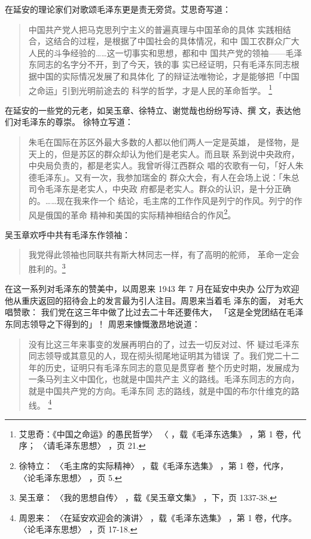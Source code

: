 在延安的理论家们对歌颂毛泽东更是责无旁贷。艾思奇写道：
\begin{quote}
	\fzwkai 中国共产党人把马克思列宁主义的普遍真理与中国革命的具体
实践相结合，这结合的过程，是根据了中国社会的具体情况，和中
国工农群众广大人民的斗争经验的……这一切事实和思想，都和中
国共产党的领袖——毛泽东同志的名字分不开，到了今天，铁的事
实已经证明，只有毛泽东同志根据中国的实际情况发展了和具体化
了的辩证法唯物论，才是能够把「中国之命运」引到光明前途去的
科学的哲学，才是人民的革命哲学。
\footnote{艾思奇：《中国之命运》的愚民哲学〉
〈
，载《毛泽东选集》
，第 1 卷，代序；
〈请毛泽东思想〉
，页 21.}
\end{quote}

在延安的一些党的元老，如吴玉章、徐特立、谢觉哉也纷纷写诗、撰
文，表达他们对毛泽东的尊崇。
徐特立写道：
\begin{quote}
	\fzwkai 朱毛在国际在苏区外最大多数的人都以他们两人一定是英雄，
是怪物，是天上的，但是苏区的群众却认为他们是老实人。而且联
系到说中央政府，中央局负责的，都是老实人。我曾听得江西群众
唱的农歌有一句，「好人朱德毛泽东」。又有一次，我参加瑞金的
群众大会，有人在会场上说：「朱总司令毛泽东是老实人，中央政
府都是老实人。群众的认识，是十分正确的。……现在我来作一个
结论，毛主席的工作作风是列宁的作风。列宁的作风是俄国的革命
精神和美国的实际精神相结合的作风\footnote{徐特立：
〈毛主席的实际精神〉
，载《毛泽东选集》
，第 1 卷，代序，
〈论毛泽东思想〉
，页 5.}。
\end{quote}

吴玉章欢呼中共有毛泽东作领袖：
\begin{quote}
	\fzwkai 我党得此领袖也同联共有斯大林同志一样，有了高明的舵师，
	革命一定会胜利的。\footnote{吴玉章：
〈我的思想自传〉
，载《吴玉章文集》
，下，页 1337-38.} 
\end{quote}

在这一系列对毛泽东的赞美中，以周恩来 1943 年 7 月在延安中央办
公厅为欢迎他从重庆返回的招待会上的发言最为引人注目。周恩来当着毛
泽东的面，
对毛大唱赞歌：
我们党在这三年中做了比过去二十年还要伟大，
「这是全党团结在毛泽东同志领导之下得到的」！
周恩来慷慨激昂地说道：
\begin{quote}
	\fzwkai 没有比这三年来事变的发展再明白的了，过去一切反对过、怀
疑过毛泽东同志领导或其意见的人，现在彻头彻尾地证明其为错误
了。我们党二十二年的历史，证明只有毛泽东同志的意见是贯穿者
整个历史时期，发展成为一条马列主义中国化，也就是中国共产主
义的路线。毛泽东同志的方向，就是中国共产党的方向。毛泽东同
志的路线，就是中国的布尔什维克的路线。
\footnote{周恩来：
〈在延安欢迎会的演讲〉
，载《毛泽东选集》
，第 1 卷，代序。〈论毛泽东思想〉
，页 17-18. }
 
\end{quote}

